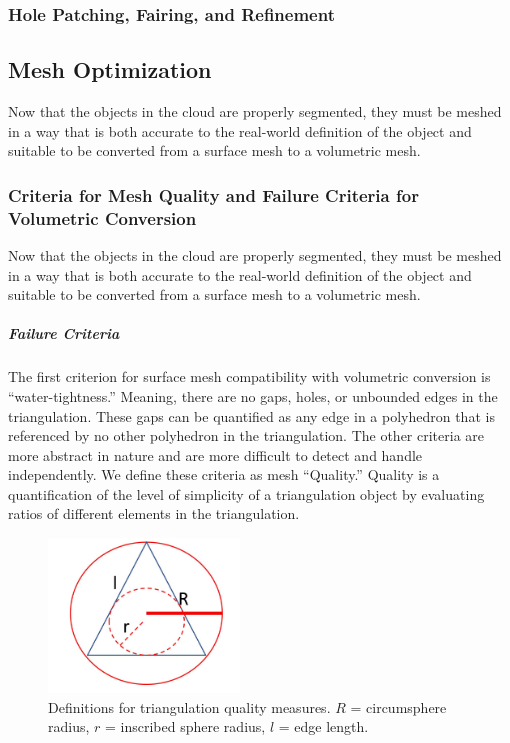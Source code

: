 \documentclass[12pt]{drexelthesis}
\let\Oldsubsection\subsection
\renewcommand{\subsection}{\FloatBarrier\Oldsubsection}
\let\Oldsubsubsection\subsubsection
\renewcommand{\subsubsection}{\FloatBarrier\Oldsubsubsection}
\begin{document}
\begin{table}[h]
\begin{tabular}{ | c | c | c | }
\\
\hline
\end{tabular}
\end{table}


 

\subsubsection{Hole Patching, Fairing, and Refinement}

\subsection{Mesh Optimization}
Now that the objects in the cloud are properly segmented, they must be meshed in a way that is both accurate to the real-world definition of the object and suitable to be converted from a surface mesh to a volumetric mesh.

\subsubsection{Criteria for Mesh Quality and Failure Criteria for Volumetric Conversion}
Now that the objects in the cloud are properly segmented, they must be meshed in a way that is both accurate to the real-world definition of the object and suitable to be converted from a surface mesh to a volumetric mesh.

\subparagraph{Failure Criteria}
The first criterion for surface mesh compatibility with volumetric conversion is “water-tightness.” Meaning, there are no gaps, holes, or unbounded edges in the triangulation. These gaps can be quantified as any edge in a polyhedron that is referenced by no other polyhedron in the triangulation.
The other criteria are more abstract in nature and are more difficult to detect and handle independently. We define these criteria as mesh “Quality.” Quality is a quantification of the level of simplicity of a triangulation object by evaluating ratios of different elements in the triangulation.

\begin{figure}[!h]
	\centering
		\includegraphics[width=2in]{triangulation_definitions.JPG}
		\caption[Definitions for triangulation quality measures]
		{\centering Definitions for triangulation quality measures. $R$ = circumsphere radius, $r$ = inscribed sphere radius, $l$ = edge length.}
		\label{fig:meshquality}
\end{figure}
\end{document}
